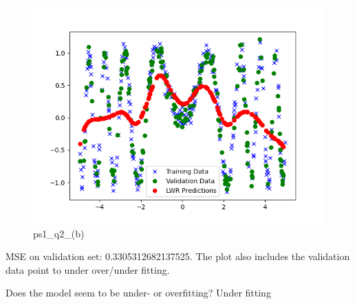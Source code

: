 \begin{answer}

\begin{figure}
    \centering
    \includegraphics[width=0.5\linewidth]{ps1_q2_(b).png}
    \caption{ps1\_q2\_(b)}
    \label{fig:enter-label}
\end{figure}

MSE on validation set: 0.3305312682137525. The plot also includes the validation data point to under over/under fitting.

Does the model seem to be under- or overfitting? Under fitting
\end{answer}
